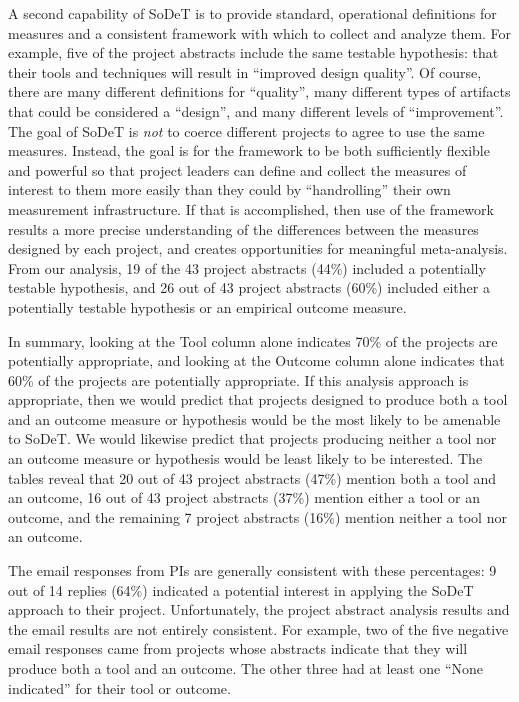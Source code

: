 A second capability of SoDeT is to provide standard, operational
definitions for measures and a consistent framework with which to collect
and analyze them.  For example, five of the project abstracts include the
same testable hypothesis: that their tools and techniques will result in
``improved design quality''.  Of course, there are many different
definitions for ``quality'', many different types of artifacts that could
be considered a ``design'', and many different levels of ``improvement''.
The goal of SoDeT is {\em not} to coerce different projects
to agree to use the same measures.  Instead, the goal is for the framework
to be both sufficiently flexible and powerful so that project leaders can
define and collect the measures of interest to them more easily than they
could by ``handrolling'' their own measurement infrastructure.  If that is
accomplished, then use of the framework results a more precise
understanding of the differences between the measures designed by each
project, and creates opportunities for meaningful meta-analysis.  From our
analysis, 19 of the 43 project abstracts (44\%) included a potentially
testable hypothesis, and 26 out of 43 project abstracts (60\%) included
either a potentially testable hypothesis or an empirical outcome measure.

In summary, looking at the Tool column alone indicates 70\% of the projects
are potentially appropriate, and looking at the Outcome column alone
indicates that 60\% of the projects are potentially appropriate.  If this
analysis approach is appropriate, then we would predict that projects
designed to produce both a tool and an outcome measure or hypothesis would
be the most likely to be amenable to SoDeT.  We would likewise
predict that projects producing neither a tool nor an outcome measure or
hypothesis would be least likely to be interested.  The tables reveal that
20 out of 43 project abstracts (47\%) mention both a tool and an outcome,
16 out of 43 project abstracts (37\%) mention either a tool or an outcome,
and the remaining 7 project abstracts (16\%) mention neither a tool nor an
outcome.

The email responses from PIs are generally consistent with these
percentages: 9 out of 14 replies (64\%) indicated a potential interest in
applying the SoDeT approach to their project.  Unfortunately, the
project abstract analysis results and the email results are not entirely
consistent.  For example, two of the five negative email responses came
from projects whose abstracts indicate that they will produce both a tool
and an outcome.  The other three had at least one ``None indicated'' for
their tool or outcome.

